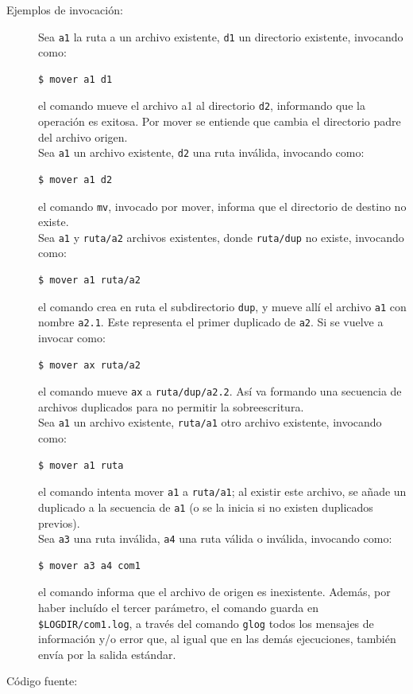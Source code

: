 \documentclass[12pt]{article}
\begin{document}
\begin{description}
	\item [Ejemplos de invocación:]
	Sea \verb|a1| la ruta a un archivo existente, \verb|d1| un directorio existente, invocando como:
	\begin{verbatim}$ mover a1 d1\end{verbatim}
	el comando mueve el archivo a1 al directorio \verb|d2|, informando que la operación es exitosa. Por mover se entiende que cambia el directorio padre del archivo origen.\\
	Sea \verb|a1| un archivo existente, \verb|d2| una ruta inválida, invocando como:
	\begin{verbatim}$ mover a1 d2\end{verbatim}
	el comando \verb|mv|, invocado por mover, informa que el directorio de destino no existe.\\
	Sea \verb|a1| y \verb|ruta/a2| archivos existentes, donde \verb|ruta/dup| no existe, invocando como:
	\begin{verbatim}$ mover a1 ruta/a2 \end{verbatim}
	el comando crea en ruta el subdirectorio \verb|dup|, y mueve allí el archivo \verb|a1| con nombre \verb|a2.1|. 
	Este representa el primer duplicado de \verb|a2|. Si se vuelve a invocar como:
	\begin{verbatim}$ mover ax ruta/a2\end{verbatim}
	el comando mueve \verb|ax| a \verb|ruta/dup/a2.2|. Así va formando una secuencia de archivos duplicados para no permitir la sobreescritura.\\
	Sea \verb|a1| un archivo existente, \verb|ruta/a1| otro archivo existente, invocando como:
	\begin{verbatim}$ mover a1 ruta\end{verbatim}
	el comando intenta mover \verb|a1| a \verb|ruta/a1|; al existir este archivo, se añade un duplicado a la secuencia de \verb|a1| (o se la inicia si no existen duplicados previos).\\
	Sea \verb|a3| una ruta inválida, \verb|a4| una ruta válida o inválida, invocando como:
	\begin{verbatim}$ mover a3 a4 com1\end{verbatim}
	el comando informa que el archivo de origen es inexistente. Además, por haber incluído el tercer parámetro, el comando guarda en \verb|$LOGDIR/com1.log|, a través del comando \verb|glog| todos los mensajes de información y/o error que, al igual que en las demás ejecuciones, también envía por la salida estándar.
	
	\item [Código fuente:]
\end{description}
{\footnotesize

}
\end{document}
